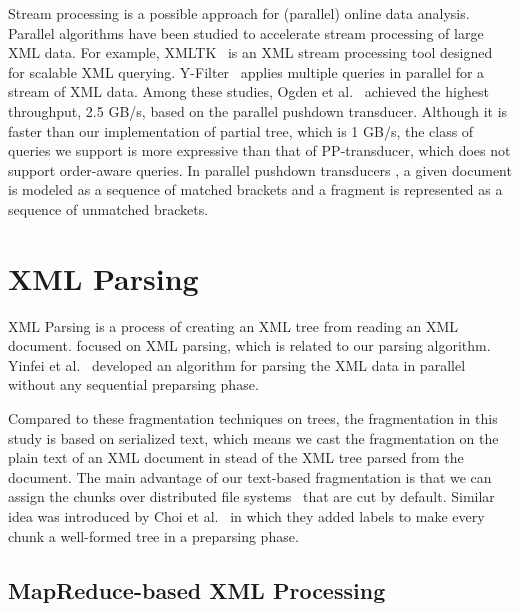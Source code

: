 Stream processing is a possible approach for (parallel) online data analysis.
Parallel algorithms have been studied to accelerate stream processing of large
XML data. For example, XMLTK~\cite{AGGR02} is an XML stream processing tool
designed for scalable XML querying. Y-Filter~\cite{ZhPC10} applies multiple
queries in parallel for a stream of XML data. Among these studies, Ogden et
al.~\cite{OgTP13} achieved the highest throughput, 2.5 GB/s, based on the
parallel pushdown transducer. Although it is faster than our implementation of
partial tree, which is 1 GB/s, the class of queries we support is more
expressive than that of PP-transducer, which does not support order-aware
queries. In parallel pushdown transducers \cite{LiZZ17}, a given document is
modeled as a sequence of matched brackets and a fragment is represented as a
sequence of unmatched brackets.

\section{XML Parsing}

XML Parsing is a process of creating an XML tree from reading an XML document.
\cite{PLZC07,WZYu08} focused on XML parsing, which is related to our parsing
algorithm. Yinfei et al.~\cite{PaZC08} developed an algorithm for parsing the
XML data in parallel without any sequential preparsing phase.

Compared to these fragmentation techniques on trees, the fragmentation in this
study is based on serialized text, which means we cast the fragmentation on the
plain text of an XML document in stead of the XML tree parsed from the document.
The main advantage of our text-based fragmentation is that we can assign the
chunks over distributed file systems~\cite{dfs} that are cut by default. Similar
idea was introduced by Choi et al.~\cite{ChLL14} in which they added labels to
make every chunk a well-formed tree in a preparsing phase. 

\subsection{MapReduce-based XML Processing} \label{sec:mapreduce}

